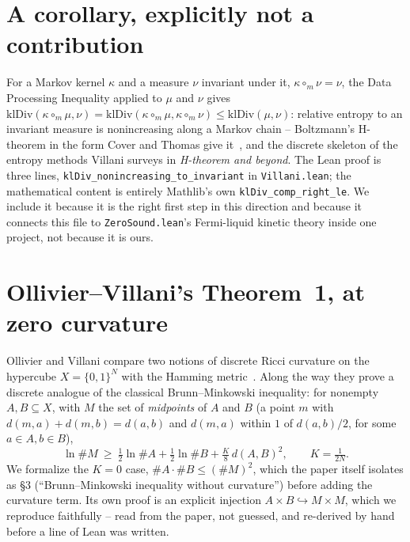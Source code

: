 \documentclass[11pt,a4paper]{article}
\newcommand{\lean}[1]{\texttt{\small #1}}
\begin{document}
\section{A corollary, explicitly not a contribution}
\label{sec:kl}

For a Markov kernel $\kappa$ and a measure $\nu$ invariant under it, $\kappa\circ_m\nu=\nu$, the Data
Processing Inequality applied to $\mu$ and $\nu$ gives
$\mathrm{klDiv}(\kappa\circ_m\mu,\nu)=\mathrm{klDiv}(\kappa\circ_m\mu,\kappa\circ_m\nu)\le
\mathrm{klDiv}(\mu,\nu)$: relative entropy to an invariant measure is nonincreasing along a Markov
chain -- Boltzmann's H-theorem in the form Cover and Thomas give it~\cite{CoverThomas2006}, and the discrete skeleton of the
entropy methods Villani surveys in \emph{H-theorem and beyond}. The Lean proof is three lines,
\lean{klDiv\_nonincreasing\_to\_invariant} in \lean{Villani.lean}; the mathematical content is entirely
Mathlib's own \lean{klDiv\_comp\_right\_le}. We include it because it is the right first step in this
direction and because it connects this file to \lean{ZeroSound.lean}'s Fermi-liquid kinetic theory
inside one project, not because it is ours.

\section{Ollivier--Villani's Theorem~1, at zero curvature}
\label{sec:ov}

Ollivier and Villani compare two notions of discrete Ricci curvature on the hypercube
$X=\{0,1\}^N$ with the Hamming metric~\cite{OllivierVillani2012}. Along the way they prove a discrete
analogue of the classical Brunn--Minkowski inequality: for nonempty $A,B\subseteq X$, with $M$ the set
of \emph{midpoints} of $A$ and $B$ (a point $m$ with $d(m,a)+d(m,b)=d(a,b)$ and $d(m,a)$ within $1$ of
$d(a,b)/2$, for some $a\in A,b\in B$),
\begin{equation}
\ln\#M\ \ge\ \tfrac12\ln\#A+\tfrac12\ln\#B+\tfrac{K}{8}\,d(A,B)^2,\qquad K=\tfrac1{2N}.
\label{eq:t1}
\end{equation}
We formalize the $K=0$ case, $\#A\cdot\#B\le(\#M)^2$, which the paper itself isolates as \S3
(``Brunn--Minkowski inequality without curvature'') before adding the curvature term. Its own proof is an
explicit injection $A\times B\hookrightarrow M\times M$, which we reproduce faithfully -- read from the
paper, not guessed, and re-derived by hand before a line of Lean was written.
\end{document}
